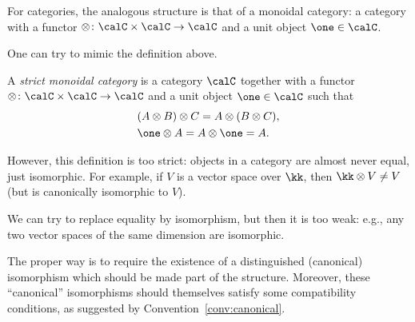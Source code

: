 For categories, the analogous structure is that of a monoidal category: a
category with a functor $\otimes \colon \calC\times \calC\to \calC$ and a unit
object $\one\in \calC$.

One can try to mimic the definition above.
\begin{definition}\label{d:strict_monoidal}
  A \emph{strict monoidal category} is a
  category $\calC$ together with a functor $\otimes \colon \calC\times \calC\to
  \calC$ and a unit object $\one\in \calC$ such that
  \begin{align*}
    &(A\otimes B)\otimes  C = A\otimes  (B\otimes C),\\
    &\one \otimes A  = A\otimes \one   = A.
  \end{align*}
\end{definition}

However, this definition is too strict: objects in a category are almost never
equal, just isomorphic. For example, if $V$ is a vector space over $\kk$, then
$\kk\otimes V\ne V$ (but is canonically isomorphic to $V$).

We can try to replace equality by isomorphism, but then it is too weak: e.g.,
any two vector spaces of the same dimension are isomorphic.

The proper way is to require the existence of a distinguished (canonical)
isomorphism which should be made part of the structure. Moreover, these
``canonical'' isomorphisms should themselves satisfy some compatibility
conditions, as suggested by Convention~\ref{conv:canonical}.

